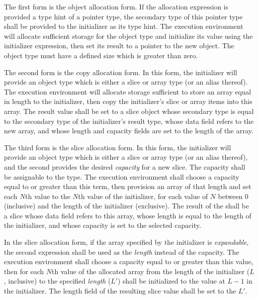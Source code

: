 \specsubsubitem
The first form is the object allocation form. If the allocation expression is
provided a type hint of a pointer type, the secondary type of this pointer type
shall be provided to the initializer as its type hint. The execution
environment will allocate sufficient storage for the object type and initialize
its value using the initializer expression, then set its result to a pointer to
the new object. The object type must have a defined size which is greater than
zero.

\specsubsubitem
The second form is the copy allocation form. In this form, the initializer will
provide an object type which is either a slice or array type (or an alias
thereof). The execution environment will allocate storage sufficient to store
an array equal in length to the initializer, then copy the initializer's slice
or array items into this array. The result value shall be set to a slice object
whose secondary type is equal to the secondary type of the initializer's result
type, whose data field refers to the new array, and whose length and capacity
fields are set to the length of the array.

\specsubsubitem
The third form is the slice allocation form. In this form, the initializer will
provide an object type which is either a slice or array type (or an alias
thereof), and the second  provides the desired
\textit{capacity} for a new slice. The capacity shall be assignable to the
 type. The execution environment shall choose a capacity equal
to or greater than this term, then provision an array of that length and set
each $N$th value to the $N$th value of the initializer, for each value of $N$
between $0$ (inclusive) and the length of the initializer (exclusive). The
result of the  shall be a slice whose data
field refers to this array, whose length is equal to the length of the
initializer, and whose capacity is set to the selected capacity.

\specsubsubitem
In the slice allocation form, if the array specified by the initializer is
\textit{expandable}, the second expression shall be used as the \textit{length}
instead of the capacity. The execution environment shall choose a capacity
equal to or greater than this value, then for each $N$th value of the allocated
array from the length of the initializer ($L$, inclusive) to the specified
\textit{length} ($L'$) shall be initialized to the value at $L-1$ in the
initializer. The length field of the resulting slice value shall be set to the
$L'$.

